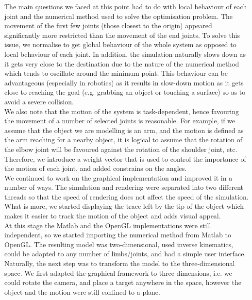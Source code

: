 \documentclass[paper=a4, fontsize=11pt]{scrartcl} %
\numberwithin{equation}{section} %
\numberwithin{figure}{section} %
\numberwithin{table}{section} %
\begin{document}
The main questions we faced at this point had to do with local behaviour of each joint and the numerical method used to solve the optimisation problem. The movement of the first few joints (those closest to the origin) appeared significantly more restricted than the movement of the end joints. To solve this issue, we normalise to get global behaviour of the whole system as opposed to local behaviour of each joint. In addition, the simulation naturally slows down as it gets very close to the destination due to the nature of the numerical method which tends to oscillate around the minimum point. This behaviour can be advantageous (especially in robotics) as it results in slow-down motion as it gets close to reaching the goal (e.g. grabbing an object or touching a surface) so as to avoid a severe collision. \\

We also note that the motion of the system is task-dependent, hence favouring the movement of a number of selected joints is reasonable. For example, if we assume that the object we are modelling is an arm, and the motion is defined as the arm reaching for a nearby object, it is logical to assume that the rotation of the elbow joint will be favoured against the rotation of the shoulder joint, etc. Therefore, we introduce a weight vector that is used to control the importance of the motion of each joint, and added constrains on the angles.\\

We continued to work on the graphical implementation and improved it in a number of ways. The simulation and rendering were separated into two different threads so that the speed of rendering does not affect the speed of the simulation. What is more, we started displaying the trace left by the tip of the object which makes it easier to track the motion of the object and adds visual appeal. \\

At this stage the Matlab and the OpenGL implementations were still independent, so we started importing the numerical method from Matlab to OpenGL. The resulting model was two-dimensional, used inverse kinematics, could be adapted to any number of limbs/joints, and had a simple user interface. \\

Naturally, the next step was to transform the model to the three-dimensional space. We first adapted the graphical framework to three dimensions, i.e. we could rotate the camera, and place a target anywhere in the space, however the object and the motion were still confined to a plane. \\
\end{document}
